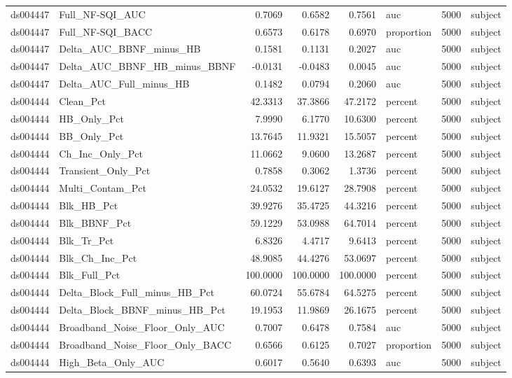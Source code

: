\begin{tabular}{llrrrlrl}
ds004447 & Full_NF-SQI_AUC & 0.7069 & 0.6582 & 0.7561 & auc & 5000 & subject \\
ds004447 & Full_NF-SQI_BACC & 0.6573 & 0.6178 & 0.6970 & proportion & 5000 & subject \\
ds004447 & Delta_AUC_BBNF_minus_HB & 0.1581 & 0.1131 & 0.2027 & auc & 5000 & subject \\
ds004447 & Delta_AUC_BBNF_HB_minus_BBNF & -0.0131 & -0.0483 & 0.0045 & auc & 5000 & subject \\
ds004447 & Delta_AUC_Full_minus_HB & 0.1482 & 0.0794 & 0.2060 & auc & 5000 & subject \\
ds004444 & Clean_Pct & 42.3313 & 37.3866 & 47.2172 & percent & 5000 & subject \\
ds004444 & HB_Only_Pct & 7.9990 & 6.1770 & 10.6300 & percent & 5000 & subject \\
ds004444 & BB_Only_Pct & 13.7645 & 11.9321 & 15.5057 & percent & 5000 & subject \\
ds004444 & Ch_Inc_Only_Pct & 11.0662 & 9.0600 & 13.2687 & percent & 5000 & subject \\
ds004444 & Transient_Only_Pct & 0.7858 & 0.3062 & 1.3736 & percent & 5000 & subject \\
ds004444 & Multi_Contam_Pct & 24.0532 & 19.6127 & 28.7908 & percent & 5000 & subject \\
ds004444 & Blk_HB_Pct & 39.9276 & 35.4725 & 44.3216 & percent & 5000 & subject \\
ds004444 & Blk_BBNF_Pct & 59.1229 & 53.0988 & 64.7014 & percent & 5000 & subject \\
ds004444 & Blk_Tr_Pct & 6.8326 & 4.4717 & 9.6413 & percent & 5000 & subject \\
ds004444 & Blk_Ch_Inc_Pct & 48.9085 & 44.4276 & 53.0697 & percent & 5000 & subject \\
ds004444 & Blk_Full_Pct & 100.0000 & 100.0000 & 100.0000 & percent & 5000 & subject \\
ds004444 & Delta_Block_Full_minus_HB_Pct & 60.0724 & 55.6784 & 64.5275 & percent & 5000 & subject \\
ds004444 & Delta_Block_BBNF_minus_HB_Pct & 19.1953 & 11.9869 & 26.1675 & percent & 5000 & subject \\
ds004444 & Broadband_Noise_Floor_Only_AUC & 0.7007 & 0.6478 & 0.7584 & auc & 5000 & subject \\
ds004444 & Broadband_Noise_Floor_Only_BACC & 0.6566 & 0.6125 & 0.7027 & proportion & 5000 & subject \\
ds004444 & High_Beta_Only_AUC & 0.6017 & 0.5640 & 0.6393 & auc & 5000 & subject \\

\end{tabular}
